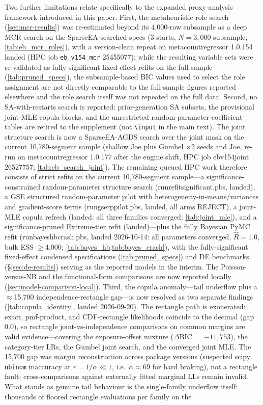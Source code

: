 \documentclass[letterpaper,8pt]{extarticle}  %
\newcommand{\file}[1]{{\ttfamily\def\_{\textunderscore\allowbreak}#1}}
\begin{document}
\begin{doublespacing}
\begin{linenumbers}
Two further limitations relate specifically to the expanded proxy-analysis framework introduced in this paper. First, the metaheuristic role search (\cref{sec:mcr-results}) was re-estimated beyond its 4,000-row subsample as a deep MCR search on the SparseEA-searched specs (3 starts, $N=3{,}000$ subsample; \cref{tab:eb_mcr_roles}), with a version-clean repeat on metacountregressor 1.0.154 landed (HPC job \texttt{eb\_v154\_mcr} 25455077); while the resulting variable sets were re-validated as fully-significant fixed-effect refits on the full sample (\cref{tab:pruned_specs}), the subsample-based BIC values used to select the role assignment are not directly comparable to the full-sample figures reported elsewhere and the role search itself was not repeated on the full data. Second, no SA-with-restarts search is reported: prior-generation SA subsets, the provisional joint-MLE copula blocks, and the unrestricted random-parameter coefficient tables are retired to the supplement (not \texttt{\textbackslash input} in the main text). The joint structure search is now a SparseEA-AGDS search over the joint mask on the current 10,780-segment sample (shallow Joe plus Gumbel $\times$2 seeds and Joe, re-run on metacountregressor 1.0.177 after the engine shift, HPC job \file{eb\_v154\_joint} 26527757; \cref{tab:eb_search_joint}). The remaining queued HPC work therefore consists of strict refits on the current 10,780-segment sample---a significance-constrained random-parameter structure search (\file{run\_refit\_significant.pbs}, landed), a GSE structured random-parameter pilot with heterogeneity-in-means/variances and gradient-score terms (\file{run\_gse\_rp\_pilot.pbs}, landed, all arms REJECT), a joint-MLE copula refresh (landed: all three families converged; \cref{tab:joint_mle}), and a significance-pruned Extreme-tier refit (landed)---plus the fully Bayesian PyMC refit (\file{run\_bayes\_hb\_crash.pbs}, landed 2026-10-14: all parameters converged, $\hat R=1.0$, bulk ESS $\geq$4{,}000; \cref{tab:bayes_hb,tab:bayes_crash}), with the fully-significant fixed-effect condensed specifications (\cref{tab:pruned_specs}) and DE benchmarks (\S\ref{sec:de-results}) serving as the reported models in the interim. The Poisson-versus-NB and the functional-form comparisons are now reported locally (\cref{sec:model-comparison-local}). Third, the copula anomaly---tail underflow plus a $\approx$15{,}700 independence-rectangle gap---is now resolved as two separate findings (\cref{tab:copula_identity}, landed 2026-09-20). The rectangle path is exonerated: exact, pmf-product, and CDF-rectangle likelihoods coincide to the decimal (gap $0.0$), so rectangle joint-vs-independence comparisons on common margins are valid evidence---covering the exposure-offset mixture ($\Delta$BIC $=-11{,}753$), the category-tier LRs, the Gumbel joint search, and the converged joint MLE. The 15{,}700 gap was margin reconstruction across package versions (suspected scipy \texttt{nbinom} inaccuracy at $r=1/\alpha\ll1$, i.e.\ $\alpha\approx69$ for hard braking), not a rectangle fault; cross-comparisons against externally fitted marginal LLs remain invalid. What stands as genuine tail behaviour is the single-family underflow itself: thousands of floored rectangle evaluations per family on the 
\end{linenumbers}
\end{doublespacing}
\end{document}
